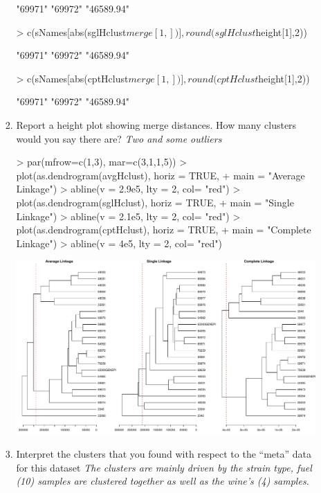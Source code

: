 \documentclass[12pt,a4paper]{paper}
\begin{document}
\begin{enumerate}
\begin{enumerate}
\begin{enumerate}
\begin{Schunk}
\begin{Soutput}
[1] "69971"    "69972"    "46589.94"
\end{Soutput}
\begin{Sinput}
> c(sNames[abs(sglHclust$merge[1,])], round(sglHclust$height[1],2))
\end{Sinput}
\begin{Soutput}
[1] "69971"    "69972"    "46589.94"
\end{Soutput}
\begin{Sinput}
> c(sNames[abs(cptHclust$merge[1,])], round(cptHclust$height[1],2))
\end{Sinput}
\begin{Soutput}
[1] "69971"    "69972"    "46589.94"
\end{Soutput}
\end{Schunk}
\item Report a height plot showing merge distances. How many clusters would you say
there are? \textit{Two and some outliers}
\begin{Schunk}
\begin{Sinput}
> par(mfrow=c(1,3), mar=c(3,1,1,5))
> plot(as.dendrogram(avgHclust), horiz = TRUE, 
+      main = "Average Linkage")
> abline(v = 2.9e5, lty = 2, col= "red")
> plot(as.dendrogram(sglHclust), horiz = TRUE, 
+      main = "Single Linkage")
> abline(v = 2.1e5, lty = 2, col= "red")
> plot(as.dendrogram(cptHclust), horiz = TRUE, 
+      main = "Complete Linkage")
> abline(v = 4e5, lty = 2, col= "red")
\end{Sinput}
\end{Schunk}
\includegraphics{Osorio_Daniel_HW2-004}
\item Interpret the clusters that you found with respect to the “meta” data for this dataset
\textit{The clusters are mainly driven by the strain type, fuel (10) samples are clustered together as well as the wine’s (4) samples.}

\end{enumerate}
\end{enumerate}
\end{enumerate}
\end{document}
